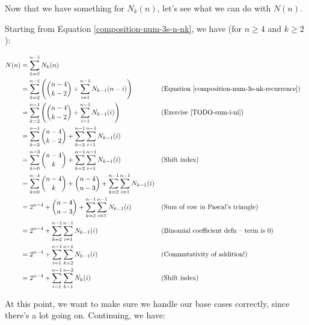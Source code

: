 Now that we have something for $N_k(n)$, let's see what we can do with $N(n)$. 

Starting from Equation \ref{composition-num-3s-n-nk}, we have (for $n \geq 4$ and $k \geq 2$):

\begin{align*}
N(n) &= \sum_{k=2}^{n-1} N_k(n) \\
&= \sum_{k=2}^{n-1} \left( \binom{n-4}{k-2} + \sum_{i=1}^{n-1} N_{k-1}(n-i) \right) && \text{(Equation \ref{composition-num-3s-nk-recurrence})} \\
&= \sum_{k=2}^{n-1} \left( \binom{n-4}{k-2} + \sum_{i=1}^{n-1} N_{k-1}(i) \right) && \text{(Exercise \ref{TODO-sum-i-ni})} \\
&= \sum_{k=2}^{n-1} \binom{n-4}{k-2} + \sum_{k=2}^{n-1} \sum_{i=1}^{n-1} N_{k-1}(i) \\
&= \sum_{k=0}^{n-3} \binom{n-4}{k} + \sum_{k=2}^{n-1} \sum_{i=1}^{n-1} N_{k-1}(i) && \text{(Shift index)} \\
&= \sum_{k=0}^{n-4} \binom{n-4}{k} + \binom{n-4}{n-3} + \sum_{k=2}^{n-1} \sum_{i=1}^{n-1} N_{k-1}(i) \\
&= 2^{n-4} + \binom{n-4}{n-3} + \sum_{k=2}^{n-1} \sum_{i=1}^{n-1} N_{k-1}(i) && \text{(Sum of row in Pascal's triangle)} \\
&= 2^{n-4} + \sum_{k=2}^{n-1} \sum_{i=1}^{n-1} N_{k-1}(i) && \text{(Binomial coefficient defn -- term is 0)} \\
&= 2^{n-4} + \sum_{i=1}^{n-1} \sum_{k=2}^{n-1} N_{k-1}(i) && \text{(Commutativity of addition!)} \\
&= 2^{n-4} + \sum_{i=1}^{n-1} \sum_{k=1}^{n-2} N_{k}(i) && \text{(Shift index)}
\end{align*}


At this point, we want to make sure we handle our base cases correctly, since there's a lot going on. Continuing, we have:

